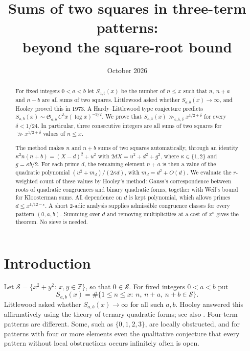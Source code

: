 \documentclass[11pt]{amsart}
\title[Sums of two squares in three-term patterns]{Sums of two squares in three-term patterns:\\ beyond the square-root bound}
\date{October 2026}
\theoremstyle{remark}
\theoremstyle{definition}
\numberwithin{equation}{section}
\newcommand{\Sc}{\mathcal{S}}
\newcommand{\Z}{\mathbb{Z}}
\newcommand{\eps}{\varepsilon}
\begin{document}
\begin{abstract}
For fixed integers $0<a<b$ let $S_{a,b}(x)$ be the number of $n\le x$ such that $n$, $n+a$ and $n+b$ are all sums of two squares. Littlewood asked whether $S_{a,b}(x)\to\infty$, and Hooley proved this in 1973. A Hardy--Littlewood type conjecture predicts $S_{a,b}(x)\sim\mathfrak S_{a,b}\,C^3x(\log x)^{-3/2}$. We prove that $S_{a,b}(x)\gg_{a,b,\delta}x^{1/2+\delta}$ for every $\delta<1/24$. In particular, three consecutive integers are all sums of two squares for $\gg x^{1/2+\delta}$ values of $n\le x$.

The method makes $n$ and $n+b$ sums of two squares automatically, through an identity $\kappa^2n(n+b)=(X-d)^2+u^2$ with $2dX=u^2+d^2+g^2$, where $\kappa\in\{1,2\}$ and $g=\kappa b/2$. For each prime $d$, the remaining element $n+a$ is then a value of the quadratic polynomial $(u^2+m_d)/(2\kappa d)$, with $m_d=d^2+O(d)$. We evaluate the $r$-weighted count of these values by Hooley's method: Gauss's correspondence between roots of quadratic congruences and binary quadratic forms, together with Weil's bound for Kloosterman sums. All dependence on $d$ is kept polynomial, which allows primes $d\le x^{1/12-\eps}$. A short $2$-adic analysis supplies admissible congruence classes for every pattern $(0,a,b)$. Summing over $d$ and removing multiplicities at a cost of $x^{\eps}$ gives the theorem. No sieve is needed.
\end{abstract}

\maketitle

\section{Introduction}

Let $\Sc=\{x^2+y^2:\ x,y\in\Z\}$, so that $0\in\Sc$. For fixed integers $0<a<b$ put
\[
S_{a,b}(x)=\#\{1\le n\le x:\ n,\ n+a,\ n+b\in\Sc\}.
\]
Littlewood asked whether $S_{a,b}(x)\to\infty$ for all such $a,b$. Hooley \cite{Ho73} answered this affirmatively using the theory of ternary quadratic forms; see also \cite[\S2.1]{FKR}. Four-term patterns are different. Some, such as $\{0,1,2,3\}$, are locally obstructed, and for patterns with four or more elements even the qualitative conjecture that every pattern without local obstructions occurs infinitely often \cite[Conjecture~2.1]{FKR} is open.
\end{document}
